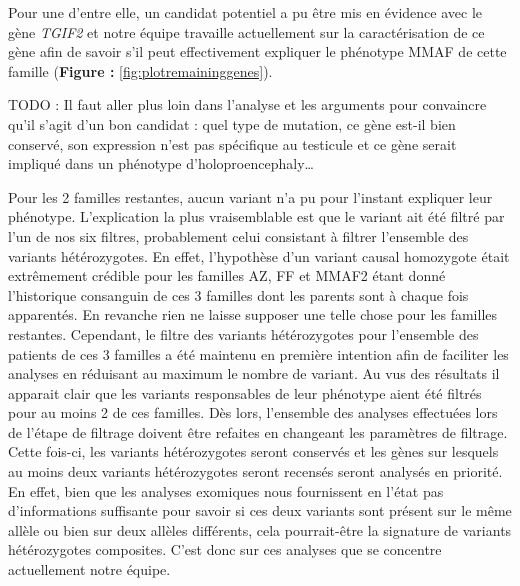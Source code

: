 \documentclass[12pt,twoside]{reedthesis}
\theoremstyle{definition}
\theoremstyle{definition}
\theoremstyle{remark}
\begin{document}
  Pour une d'entre elle, un candidat potentiel a pu être mis en évidence
  avec le gène \emph{TGIF2} et notre équipe travaille actuellement sur la
  caractérisation de ce gène afin de savoir s'il peut effectivement
  expliquer le phénotype MMAF de cette famille (\textbf{Figure :
  }\ref{fig:plotremaininggenes}).
  
  TODO : Il faut aller plus loin dans l'analyse et les arguments pour
  convaincre qu'il s'agit d'un bon candidat : quel type de mutation, ce
  gène est-il bien conservé, son expression n'est pas spécifique au
  testicule et ce gène serait impliqué dans un phénotype
  d'holoproencephaly\ldots{}
  
  Pour les 2 familles restantes, aucun variant n'a pu pour l'instant
  expliquer leur phénotype. L'explication la plus vraisemblable est que le
  variant ait été filtré par l'un de nos six filtres, probablement celui
  consistant à filtrer l'ensemble des variants hétérozygotes. En effet,
  l'hypothèse d'un variant causal homozygote était extrêmement crédible
  pour les familles AZ, FF et MMAF2 étant donné l'historique consanguin de
  ces 3 familles dont les parents sont à chaque fois apparentés. En
  revanche rien ne laisse supposer une telle chose pour les familles
  restantes. Cependant, le filtre des variants hétérozygotes pour
  l'ensemble des patients de ces 3 familles a été maintenu en première
  intention afin de faciliter les analyses en réduisant au maximum le
  nombre de variant. Au vus des résultats il apparait clair que les
  variants responsables de leur phénotype aient été filtrés pour au moins
  2 de ces familles. Dès lors, l'ensemble des analyses effectuées lors de
  l'étape de filtrage doivent être refaites en changeant les paramètres de
  filtrage. Cette fois-ci, les variants hétérozygotes seront conservés et
  les gènes sur lesquels au moins deux variants hétérozygotes seront
  recensés seront analysés en priorité. En effet, bien que les analyses
  exomiques nous fournissent en l'état pas d'informations suffisante pour
  savoir si ces deux variants sont présent sur le même allèle ou bien sur
  deux allèles différents, cela pourrait-être la signature de variants
  hétérozygotes composites. C'est donc sur ces analyses que se concentre
  actuellement notre équipe.
  
  \newpage
  
\end{document}
